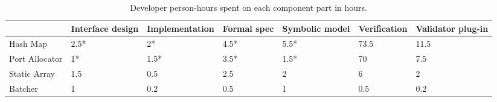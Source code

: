 \documentclass[letterpaper,twocolumn,10pt]{article}
\begin{document}
\begin{table}[h!]
\centering
\caption{Developer person-hours spent on each component part in hours.}
\label{tab:man-hours}
\begin{tabular}{lllllll}
\hline
               & Interface design & Implementation & Formal spec & Symbolic model & Verification & Validator plug-in \\ \hline
Hash Map        & 2.5*       & 2*             & 4.5*                 & 5.5*           & 73.5         & 11.5             \\
Port Allocator & 1*         & 1.5*           & 3.5*                 & 1.5*           & 70           & 7.5              \\
Static Array   & 1.5        & 0.5            & 2.5                  & 2              & 6            & 2                \\
Batcher        & 1          & 0.2            & 0.5                  & 1              & 0.5          & 0.2              \\ \hline
\end{tabular}
\end{table}
\end{document}
